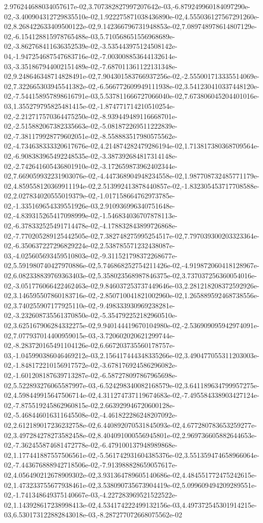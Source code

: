 2.976244688034057617e-02,3.707382827997207642e-03,-6.879249960184097290e-02,-3.400904312729835510e-02,1.922275871038436890e-02,4.555036127567291260e-02,8.268422633409500122e-02,9.142366796731948853e-02,7.089748978614807129e-02,-6.154128815978765488e-03,5.710568651556968689e-02,-3.862768411636352539e-02,-3.535443975124508142e-04,-1.947254687547683716e-02,-7.003008853644132614e-03,-3.351867944002151489e-02,-7.687011361122131348e-02,9.248646348714828491e-02,7.904301583766937256e-02,-2.555001713335514069e-02,7.322665303945541382e-02,-6.566772609949111938e-02,3.541230410337448120e-02,-7.544158957898616791e-03,5.537811666727066040e-02,7.673806045204401016e-03,1.355279795825481415e-02,-1.874771714210510254e-02,-2.212717570364475250e-02,-8.939449489116668701e-02,-2.515882067382335663e-02,-5.081872269511222839e-02,-7.381179928779602051e-02,-8.558883517980575562e-02,-4.734638333320617676e-02,4.214874282479286194e-02,1.713817380368709564e-02,-6.908383965492248535e-02,-3.387392684817314148e-02,-2.742641605436801910e-02,-3.172659873962402344e-02,7.669059932231903076e-02,-4.447368904948234558e-02,1.987708732485771179e-02,4.859558120369911194e-02,2.513992413878440857e-02,-1.832305453717708588e-02,2.027834020555019379e-02,-1.017158664762973785e-02,-1.335169654339551926e-03,2.910936996340751648e-02,-4.839315265417098999e-02,-1.546834036707878113e-02,-6.378332525491714478e-02,-4.178832843899726868e-02,-7.770205289125442505e-02,7.382748275995254517e-02,7.797039300203323364e-02,-6.350637227296829224e-02,2.538785571232438087e-03,-4.025605693459510803e-02,-9.311521798372268677e-02,5.591980740427970886e-02,5.746868252754211426e-02,-4.919872060418128967e-02,6.082338839769363403e-02,5.358023568987846375e-02,3.737037256360054016e-02,-3.051776066422462463e-02,9.846037253737449646e-03,2.281218208372592926e-02,3.146595507860183716e-02,-2.850710041821002960e-02,1.265889592468738556e-02,3.740255907177925110e-02,-9.498333930969238281e-02,-3.232608735561370850e-02,-5.354792252182960510e-02,3.625167906284332275e-02,9.940144419670104980e-02,-2.536909095942974091e-02,7.077937014400959015e-03,-3.720602020621299744e-02,-8.283720165491104126e-02,6.667203735560178757e-03,-1.045990386046469212e-03,2.156417444348335266e-02,3.490477055311203003e-02,-1.848172210156917572e-02,-3.678176924586296082e-02,-1.601208187639713287e-02,-6.587278097867965698e-02,5.522893276065587997e-03,-6.524298340082168579e-02,3.641189634799957275e-02,4.598449915647506714e-02,4.311274737119674683e-02,-7.495584338903427124e-02,-7.875519245862960815e-02,2.663929946720600128e-02,-5.468446016311645508e-02,-4.461822286248207092e-02,2.612189017236232758e-02,6.440892070531845093e-02,4.677280783653259277e-02,3.497284278273582458e-02,8.404091000556945801e-02,2.969736605882644653e-02,-7.362455874681472778e-02,-6.479100137948989868e-02,1.177441887557506561e-02,-5.561742931604385376e-02,3.551359474658966064e-02,-7.443676888942718506e-02,-7.913988828659057617e-02,4.056490212678909302e-02,3.931364789605140686e-02,4.484551772475242615e-02,1.473233755677938461e-02,3.538090735673904419e-02,5.099609494209289551e-02,-1.741348649375140667e-03,-4.227283969521522522e-02,1.143928617238998413e-02,4.534174222499132156e-03,4.497372545301914215e-03,6.530173122882843018e-03,-8.287277072668075562e-02
